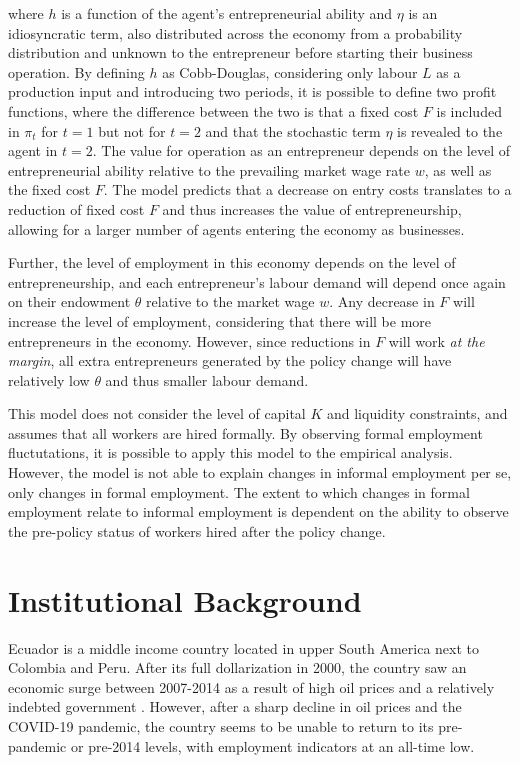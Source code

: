 \documentclass[11pt,a4paper]{article}\usepackage[]{graphicx}\usepackage[]{xcolor}
\begin{document}
where $h$ is a function of the agent's entrepreneurial ability and $\eta$ is an idiosyncratic term, also distributed across the economy from a probability distribution and unknown to the entrepreneur before starting their business operation. By defining $h$ as Cobb-Douglas, considering only labour $L$ as a production input and introducing two periods, it is possible to define two profit functions, where the difference between the two is that a fixed cost $F$ is included in $\pi_t$ for $t = 1$ but not for $t=2$ and that the stochastic term $\eta$ is revealed to the agent in $t=2$. The value for operation as an entrepreneur depends on the level of entrepreneurial ability relative to the prevailing market wage rate $w$, as well as the fixed cost $F$. The model predicts that a decrease on entry costs translates to a reduction of fixed cost $F$ and thus increases the value of entrepreneurship, allowing for a larger number of agents entering the economy as businesses. 

Further, the level of employment in this economy depends on the level of entrepreneurship, and each entrepreneur's labour demand will depend once again on their endowment $\theta$ relative to the market wage $w$. Any decrease in $F$ will increase the level of employment, considering that there will be more entrepreneurs in the economy. However, since reductions in $F$ will work \textit{at the margin}, all extra entrepreneurs generated by the policy change will have relatively low $\theta$ and thus smaller labour demand.

This model does not consider the level of capital $K$ and liquidity constraints, and assumes that all workers are hired formally. By observing formal employment fluctutations, it is possible to apply this model to the empirical analysis. However, the model is not able to explain changes in informal employment per se, only changes in formal employment. The extent to which changes in formal employment relate to informal employment is dependent on the ability to observe the pre-policy status of workers hired after the policy change.

\section{Institutional Background}

Ecuador is a middle income country located in upper South America next to Colombia and Peru. After its full dollarization in 2000, the country saw an economic surge between 2007-2014 as a result of high oil prices and a relatively indebted government \parencite{Weisbrot.2017}. However, after a sharp decline in oil prices and the COVID-19 pandemic, the country seems to be unable to return to its pre-pandemic or pre-2014 levels, with employment indicators at an all-time low. 
\end{document}
